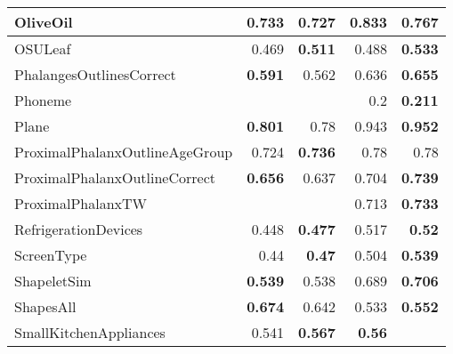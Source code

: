 \begin{longtable}{|l||r|r||r|r|}
\hline
\rowcolor[rgb]{ .851,  .851,  .851} OliveOil &
\cellcolor[rgb]{ .973,  .796,  .678} \textbf{0.733} &
0.727 &
\cellcolor[rgb]{ .973,  .796,  .678} \textbf{0.833} &
0.767
\bigstrut\\
\hline
OSULeaf &
0.469 &
\cellcolor[rgb]{ .973,  .796,  .678} \textbf{0.511} &
0.488 &
\cellcolor[rgb]{ .973,  .796,  .678} \textbf{0.533}
\bigstrut\\
\hline
\rowcolor[rgb]{ .851,  .851,  .851} PhalangesOutlinesCorrect &
\cellcolor[rgb]{ .973,  .796,  .678} \textbf{0.591} &
0.562 &
0.636 &
\cellcolor[rgb]{ .973,  .796,  .678} \textbf{0.655}
\bigstrut\\
\hline
Phoneme &
&
&
0.2 &
\cellcolor[rgb]{ .973,  .796,  .678} \textbf{0.211}
\bigstrut\\
\hline
\rowcolor[rgb]{ .851,  .851,  .851} Plane &
\cellcolor[rgb]{ .973,  .796,  .678} \textbf{0.801} &
0.78 &
0.943 &
\cellcolor[rgb]{ .973,  .796,  .678} \textbf{0.952}
\bigstrut\\
\hline
ProximalPhalanxOutlineAgeGroup &
0.724 &
\cellcolor[rgb]{ .973,  .796,  .678} \textbf{0.736} &
0.78 &
0.78
\bigstrut\\
\hline
\rowcolor[rgb]{ .851,  .851,  .851} ProximalPhalanxOutlineCorrect &
\cellcolor[rgb]{ .973,  .796,  .678} \textbf{0.656} &
0.637 &
0.704 &
\cellcolor[rgb]{ .973,  .796,  .678} \textbf{0.739}
\bigstrut\\
\hline
ProximalPhalanxTW &
&
&
0.713 &
\cellcolor[rgb]{ .973,  .796,  .678} \textbf{0.733}
\bigstrut\\
\hline
\rowcolor[rgb]{ .851,  .851,  .851} RefrigerationDevices &
0.448 &
\cellcolor[rgb]{ .973,  .796,  .678} \textbf{0.477} &
0.517 &
\cellcolor[rgb]{ .973,  .796,  .678} \textbf{0.52}
\bigstrut\\
\hline
ScreenType &
0.44 &
\cellcolor[rgb]{ .973,  .796,  .678} \textbf{0.47} &
0.504 &
\cellcolor[rgb]{ .973,  .796,  .678} \textbf{0.539}
\bigstrut\\
\hline
\rowcolor[rgb]{ .851,  .851,  .851} ShapeletSim &
\cellcolor[rgb]{ .973,  .796,  .678} \textbf{0.539} &
0.538 &
0.689 &
\cellcolor[rgb]{ .973,  .796,  .678} \textbf{0.706}
\bigstrut\\
\hline
ShapesAll &
\cellcolor[rgb]{ .973,  .796,  .678} \textbf{0.674} &
0.642 &
0.533 &
\cellcolor[rgb]{ .973,  .796,  .678} \textbf{0.552}
\bigstrut\\
\hline
\rowcolor[rgb]{ .851,  .851,  .851} SmallKitchenAppliances &
0.541 &
\cellcolor[rgb]{ .973,  .796,  .678} \textbf{0.567} &
\cellcolor[rgb]{ .973,  .796,  .678} \textbf{0.56} &

\end{longtable}
